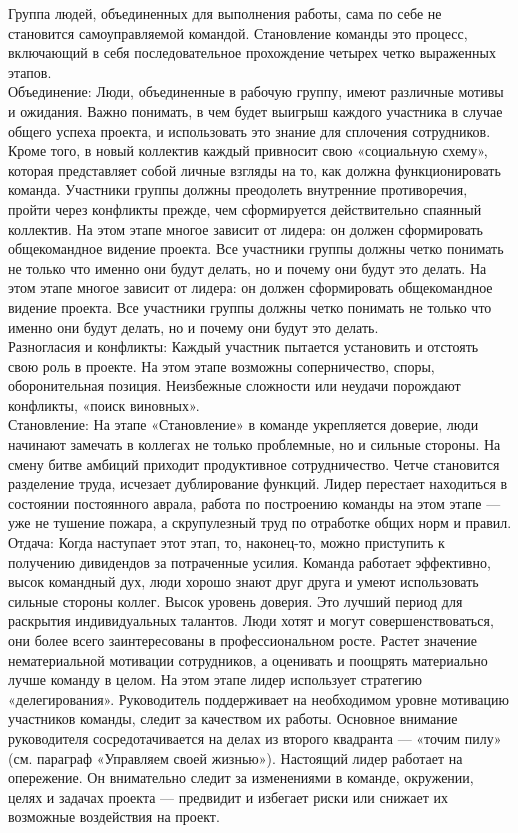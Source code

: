\documentclass{../industrial-development}
\begin{document}
\lecturenotes

Группа людей, объединенных для выполнения работы, сама по себе не становится самоуправляемой командой. Становление команды это процесс, включающий в себя последовательное прохождение четырех четко выраженных этапов.\\
Объединение:
Люди, объединенные в рабочую группу, имеют различные мотивы и ожидания. Важно понимать, в чем будет выигрыш каждого участника в случае общего успеха проекта, и использовать это знание для сплочения сотрудников. Кроме того, в новый коллектив каждый привносит свою «социальную схему», которая представляет собой личные взгляды на то, как должна функционировать команда. Участники группы должны преодолеть внутренние противоречия, пройти через конфликты прежде, чем сформируется действительно спаянный коллектив. На этом этапе многое зависит от лидера: он должен сформировать общекомандное видение проекта. Все участники группы должны четко понимать не только что именно они будут делать, но и почему они будут это делать. На этом этапе многое зависит от лидера: он должен сформировать общекомандное видение проекта. Все участники группы должны четко понимать не только что именно они будут делать, но и почему они будут это делать.\\
Разногласия и конфликты:
Каждый участник пытается установить и отстоять свою роль в проекте. На этом этапе возможны соперничество, споры, оборонительная позиция. Неизбежные сложности или неудачи порождают конфликты, «поиск виновных».\\
Становление:
На этапе «Становление» в команде укрепляется доверие, люди начинают замечать в коллегах не только проблемные, но и сильные стороны. На смену битве амбиций приходит продуктивное сотрудничество. Четче становится разделение труда, исчезает дублирование функций. Лидер перестает находиться в состоянии постоянного аврала, работа по построению команды на этом этапе — уже не тушение пожара, а скрупулезный труд по отработке общих норм и правил.\\
Отдача:
Когда наступает этот этап, то, наконец-то, можно приступить к получению дивидендов за потраченные усилия. Команда работает эффективно, высок командный дух, люди хорошо знают друг друга и умеют использовать сильные стороны коллег. Высок уровень доверия. Это лучший период для раскрытия индивидуальных талантов. Люди хотят и могут совершенствоваться, они более всего заинтересованы в профессиональном росте. Растет значение нематериальной мотивации сотрудников, а оценивать и поощрять материально лучше команду в целом.
На этом этапе лидер использует стратегию «делегирования». Руководитель поддерживает на необходимом уровне мотивацию участников команды, следит за качеством их работы. Основное внимание руководителя сосредотачивается на делах из второго квадранта — «точим пилу» (см. параграф «Управляем своей жизнью»). Настоящий лидер работает на опережение. Он внимательно следит за изменениями в команде, окружении, целях и задачах проекта — предвидит и избегает риски или снижает их возможные воздействия на проект.
\end{document}
